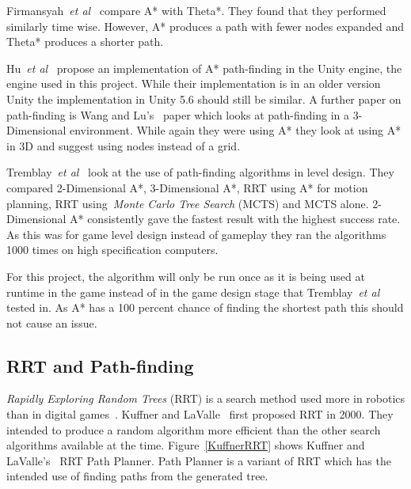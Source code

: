 \documentclass[journal]{IEEEtran}
\begin{document}
	Firmansyah~\textit{et al}~\cite{Firmansyah2016} compare A* with Theta*. They found that they performed similarly time wise. However, A* produces a path with fewer nodes expanded and Theta* produces a shorter path. 
	
	Hu~\textit{et al}~\cite{Hu2012} propose an implementation of A* path-finding in the Unity engine, the engine used in this project.  While their implementation is in an older version Unity the implementation in Unity 5.6 should still be similar. A further paper on path-finding is Wang and Lu's~\cite{wang2012} paper which looks at path-finding in a 3-Dimensional environment. While again they were using A* they look at using A* in 3D and suggest using nodes instead of a grid.
	
	Tremblay~\textit{et al}~\cite{Tremblay2014} look at the use of path-finding algorithms in level design. They compared 2-Dimensional A*, 3-Dimensional A*, RRT using A* for motion planning, RRT using~\textit{Monte Carlo Tree Search} (MCTS) and MCTS alone. 2-Dimensional A* consistently gave the fastest result with the highest success rate. As this was for game level design instead of gameplay they ran the algorithms 1000 times on high specification computers. 
	
	For this project, the algorithm will only be run once as it is being used at runtime in the game instead of in the game design stage that Tremblay~\textit{et al}~\cite{Tremblay2014} tested in. As A* has a 100 percent chance of finding the shortest path this should not cause an issue. 
	
	\subsection{RRT and Path-finding} \label{RRTadnPathfinding}
	\textit{Rapidly Exploring Random Trees} (RRT) is a search method used more in robotics than in digital games~\cite{LaValle1998, Kuffner2000}. Kuffner and LaValle~\cite{Kuffner2000} first proposed RRT in 2000. They intended to produce a random algorithm more efficient than the other search algorithms available at the time.  Figure~\ref{KuffnerRRT} shows Kuffner and LaValle's~\cite{Kuffner2000} RRT Path Planner. Path Planner is a variant of RRT which has the intended use of finding paths from the generated tree.
	
\end{document}
